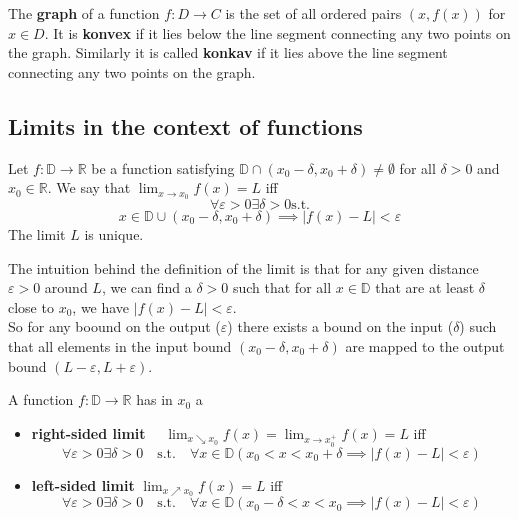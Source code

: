 \begin{definition}
    The \textbf{graph} of a function $f: D \to C$ is the set of all ordered pairs $(x, f(x))$ for $x \in D$. It is \textbf{konvex} if it lies below the line segment connecting any two points on the graph. Similarly it is called \textbf{konkav} if it lies above the line segment connecting any two points on the graph.
\end{definition}

\subsection{Limits in the context of functions}

\begin{definition}
    Let $f: \mathbb{D} \to \mathbb{R}$ be a function satisfying $\mathbb{D} \cap (x_0 - \delta, x_0 + \delta) \neq \emptyset$ for all $\delta > 0$ and $x_0 \in \mathbb{R}$. We say that $\lim_{x \to x_0} f(x) = L$ iff 
    $$\forall \varepsilon > 0 \exists \delta > 0  \text{s.t.}$$
    $$x \in \mathbb{D} \cup (x_0 - \delta, x_0 + \delta) \implies |f(x) - L| < \varepsilon$$
    The limit $L$ is unique.
\end{definition}

\begin{remark}
The intuition behind the definition of the limit is that for any given distance $\varepsilon > 0$ around $L$, 
we can find a $\delta > 0$ such that for all $x \in \mathbb{D}$ that are at least $\delta$ close to $x_0$, we have $|f(x) - L| < \varepsilon$. 
\\
So for any boound on the output ($\varepsilon$) there exists a bound on the input ($\delta$) such that all elements in the input bound $(x_0 - \delta, x_0 + \delta)$ are mapped to the output bound $(L - \varepsilon, L + \varepsilon)$.
\end{remark}

\begin{definition}
    A function $f: \mathbb{D} \to \mathbb{R}$ has in $x_0$ a

    \begin{itemize}
        \item \textbf{right-sided limit} $\quad \lim_{x \searrow x_0} f(x) = \lim_{x \to x_0^+} f(x) = L$ iff 
        $$\forall \varepsilon > 0 \exists \delta > 0  \quad \text{s.t.} \quad \forall x \in \mathbb{D} (x_0 < x < x_0 + \delta \implies |f(x) - L| < \varepsilon)$$
        \item \textbf{left-sided limit} $\lim_{x \nearrow x_0} f(x) = L$ iff 
        $$\forall \varepsilon > 0 \exists \delta > 0  \quad \text{s.t.} \quad \forall x \in \mathbb{D} (x_0 - \delta < x < x_0 \implies |f(x) - L| < \varepsilon)$$
    \end{itemize}
    
\end{definition}

